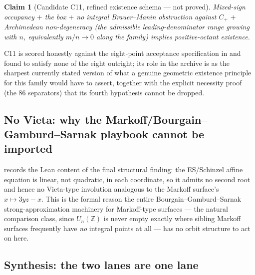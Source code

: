 \documentclass[11pt]{article}
\theoremstyle{plain}
\newtheorem{claimstmt}[theorem]{Claim}
\theoremstyle{definition}
\theoremstyle{remark}
\renewcommand{\_}{\textunderscore\allowbreak}
\newcommand{\Z}{\mathbb{Z}}
\begin{document}
\begin{claimstmt}[Candidate C11, refined existence schema — not proved]
\label{claim:c11}
Mixed-sign occupancy $+$ the box $+$ no integral Brauer--Manin obstruction against $C_+$ $+$
\emph{Archimedean non-degeneracy} (the admissible leading-denominator range growing with $n$,
equivalently $m/n\to0$ along the family) implies positive-octant existence.
\end{claimstmt}
C11 is scored honestly against the eight-point acceptance specification in  and
found to satisfy none of the eight outright; its role in the archive is as the sharpest currently
stated version of what a genuine geometric existence principle for this family would have to
assert, together with the explicit necessity proof (the 86 separators) that its fourth hypothesis
cannot be dropped.

\subsection{No Vieta: why the Markoff/Bourgain--Gamburd--Sarnak playbook cannot be imported}

 records the Lean content of the final structural finding: the ES/Schinzel
affine equation is linear, not quadratic, in each coordinate, so it admits no second root and
hence no Vieta-type involution analogous to the Markoff surface's $x\mapsto3yz-x$. This is the
formal reason the entire Bourgain--Gamburd--Sarnak strong-approximation machinery
\cite{BGS2016,GhoshSarnak2022} for Markoff-type surfaces — the natural comparison class,
since $U_n(\Z)$ is never empty exactly where sibling Markoff surfaces frequently have \emph{no}
integral points at all \cite{LoughranMitankin2021,CTWX2020} — has no orbit structure to act on
here.

\subsection{Synthesis: the two lanes are one lane}
\label{subsec:synthesis}
\end{document}
